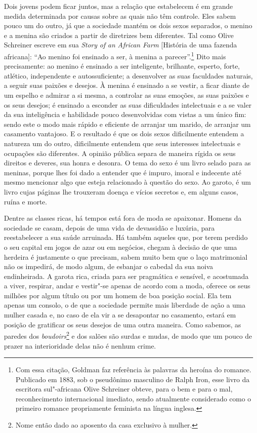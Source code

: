 Dois jovens podem ficar juntos, mas a relação que estabelecem é em
grande medida determinada por causas sobre as quais não têm controle.
Eles sabem pouco um do outro, já que a sociedade mantém os dois sexos
separados, o menino e a menina são criados a partir de diretrizes bem
diferentes. Tal como Olive Schreiner escreve em sua \emph{Story of an African Farm} {[}História de
uma fazenda africana{]}: ``Ao menino
foi ensinado a ser, à menina a parecer''.\footnote{Com essa citação,
  Goldman faz referência às palavras da heroína do romance. Publicado em
  1883, sob o pseudônimo masculino de Ralph Iron, esse livro da
  escritora sul"-africana Olive Schreiner obteve, para o bem e para o
  mal, reconhecimento internacional imediato, sendo atualmente
  considerado como o primeiro romance propriamente feminista na língua
  inglesa.} Dito mais precisamente: ao menino é ensinado a ser
inteligente, brilhante, esperto, forte, atlético, independente e
autossuficiente; a desenvolver as suas faculdades naturais, a seguir
suas paixões e desejos. À menina é ensinado a se vestir, a ficar
diante de um espelho e admirar a si mesma, a controlar as suas emoções, as
suas paixões e os seus desejos; é ensinado a esconder as suas dificuldades
intelectuais e a se valer da sua inteligência e habilidade pouco desenvolvidas com vistas a um único fim: sendo este o modo mais rápido e eficiente de
arranjar um marido, de arranjar um casamento vantajoso. E o resultado é
que os dois sexos dificilmente entendem a natureza um do outro,
dificilmente entendem que seus interesses intelectuais e ocupações são
diferentes. A opinião pública separa de maneira rígida os seus direitos
e deveres, sua honra e desonra. O tema do sexo é um livro selado para as
meninas, porque lhes foi dado a entender que é impuro, imoral e
indecente até mesmo mencionar algo que esteja relacionado à questão do
sexo. Ao garoto, é um livro cujas páginas lhe trouxeram doença e vícios
secretos e, em alguns casos, ruína e morte.

Dentre as classes ricas, há tempos está fora de moda se apaixonar.
Homens da sociedade se casam, depois de uma vida de devassidão e luxúria,
para reestabelecer a sua saúde arruinada. Há também aqueles que, por terem
perdido o seu capital em jogos de azar ou em negócios, chegam à decisão
de que uma herdeira é justamente o que precisam, sabem muito bem que o
laço matrimonial não os impedirá, de modo algum, de esbanjar o cabedal
da sua noiva endinheirada. A garota rica, criada para ser pragmática e
sensível, e acostumada a viver, respirar, andar e vestir"-se apenas de
acordo com a moda, oferece os seus milhões por algum título ou por um
homem de boa posição social. Ela tem apenas um consolo, o de
que a sociedade permite mais liberdade de ação a uma mulher casada e, no
caso de ela vir a se desapontar no casamento, estará em posição de
gratificar os seus desejos de uma outra maneira. Como sabemos, as
paredes dos \emph{boudoirs}\footnote{Nome então dado ao aposento da casa
  exclusivo à mulher.} e dos salões são surdas e mudas, de modo que um
pouco de prazer na interioridade delas não é nenhum crime.

